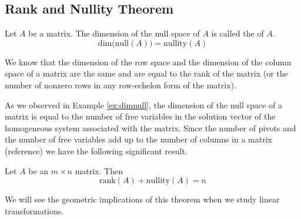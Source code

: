 \documentclass{ximera}
\begin{document}
\subsection*{Rank and Nullity Theorem}
\begin{definition}\label{def:matrixnullity}
Let $A$ be a matrix.  The dimension of the null space of $A$ is called the  of $A$.
$$\mbox{dim}\Big(\mbox{null}(A)\Big)=\mbox{nullity}(A)$$
\end{definition}

We know that the dimension of the row space and the dimension of the column space of a matrix are the same and are equal to the rank of the matrix (or the number of nonzero rows in any row-echelon form of the matrix).

As we observed in Example \ref{ex:dimnull}, the dimension of the null space of a matrix is equal to the number of free variables in the solution vector of the homogeneous system associated with the matrix.  Since the number of pivots and the number of free variables add up to the number of columns in a matrix ({\color{red}reference}) we have the following significant result.

\begin{theorem}\label{th:matrixranknullity} Let $A$ be an $m\times n$ matrix.  Then 
$$\mbox{rank}(A)+\mbox{nullity}(A)=n$$
\end{theorem}
We will see the geometric implications of this theorem when we study linear transformations.
\end{document}
